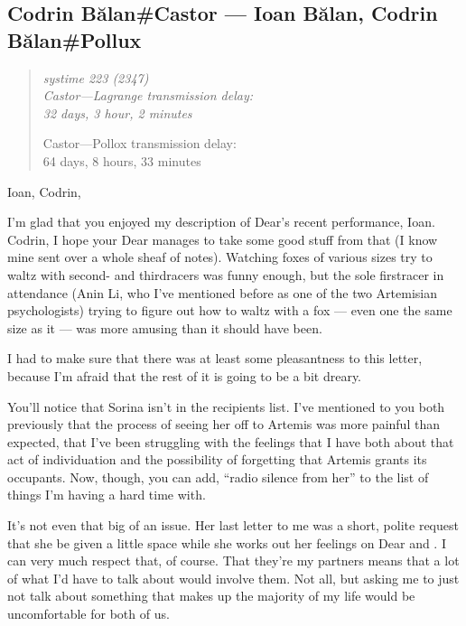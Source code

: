 \hypertarget{codrin-bux103lancastor-ioan-bux103lan-codrin-bux103lanpollux}{%
\subsection{Codrin Bălan\#Castor — Ioan Bălan, Codrin Bălan\#Pollux}\label{codrin-bux103lancastor-ioan-bux103lan-codrin-bux103lanpollux}}

\begin{quote}
\itshape
systime 223 (2347)\\

Castor---Lagrange transmission delay:\\
32 days, 3 hour, 2 minutes

Castor---Pollox transmission delay:\\
64 days, 8 hours, 33 minutes
\end{quote}

Ioan, Codrin,

I'm glad that you enjoyed my description of Dear's recent performance, Ioan. Codrin, I hope your Dear manages to take some good stuff from that (I know mine sent over a whole sheaf of notes). Watching foxes of various sizes try to waltz with second- and thirdracers was funny enough, but the sole firstracer in attendance (Anin Li, who I've mentioned before as one of the two Artemisian psychologists) trying to figure out how to waltz with a fox — even one the same size as it — was more amusing than it should have been.

I had to make sure that there was at least some pleasantness to this letter, because I'm afraid that the rest of it is going to be a bit dreary.

You'll notice that Sorina isn't in the recipients list. I've mentioned to you both previously that the process of seeing her off to Artemis was more painful than expected, that I've been struggling with the feelings that I have both about that act of individuation and the possibility of forgetting that Artemis grants its occupants. Now, though, you can add, ``radio silence from her'' to the list of things I'm having a hard time with.

It's not even that big of an issue. Her last letter to me was a short, polite request that she be given a little space while she works out her feelings on Dear and \Partner . I can very much respect that, of course. That they're my partners means that a lot of what I'd have to talk about would involve them. Not all, but asking me to just not talk about something that makes up the majority of my life would be uncomfortable for both of us.

